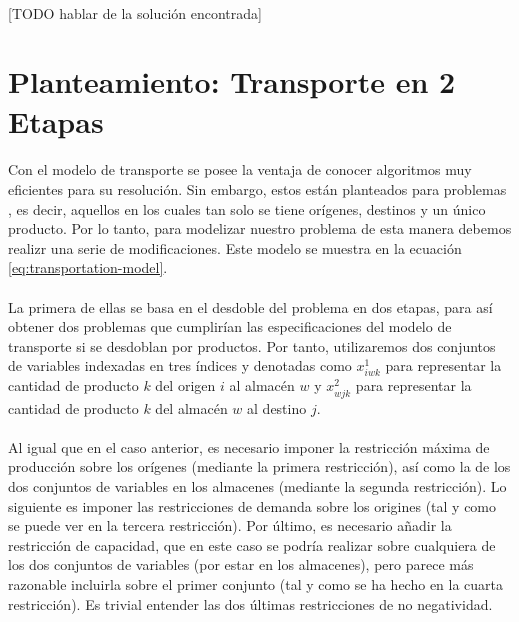 \documentclass{article}
\begin{document}
    \paragraph{}
    [TODO hablar de la solución encontrada]


  \section{Planteamiento: Transporte en 2 Etapas}
  \label{section:transportation}

    \paragraph{}
    Con el modelo de transporte se posee la ventaja de conocer algoritmos muy eficientes para su resolución. Sin embargo, estos están planteados para problemas , es decir, aquellos en los cuales tan solo se tiene orígenes, destinos y un único producto. Por lo tanto, para modelizar nuestro problema de esta manera debemos realizr una serie de modificaciones. Este modelo se muestra en la ecuación \eqref{eq:transportation-model}.

    \paragraph{}
    La primera de ellas se basa en el desdoble del problema en dos etapas, para así obtener dos problemas que cumplirían las especificaciones del modelo de transporte si se desdoblan por productos. Por tanto, utilizaremos dos conjuntos de variables indexadas en tres índices y denotadas como $x^{1}_{iwk}$ para representar la cantidad de producto $k$ del origen $i$ al almacén $w$ y $x^{2}_{wjk}$ para representar la cantidad de producto $k$ del almacén $w$ al destino $j$.

    \paragraph{}
    Al igual que en el caso anterior, es necesario imponer la restricción máxima de producción sobre los orígenes (mediante la primera restricción), así como la  de los dos conjuntos de variables en los almacenes (mediante la segunda restricción). Lo siguiente es imponer las restricciones de demanda sobre los origines (tal y como se puede ver en la tercera restricción). Por último, es necesario añadir la restricción de capacidad, que en este caso se podría realizar sobre cualquiera de los dos conjuntos de variables (por estar en los almacenes), pero parece más razonable incluirla sobre el primer conjunto (tal y como se ha hecho en la cuarta restricción). Es trivial entender las dos últimas restricciones de no negatividad.
\end{document}
